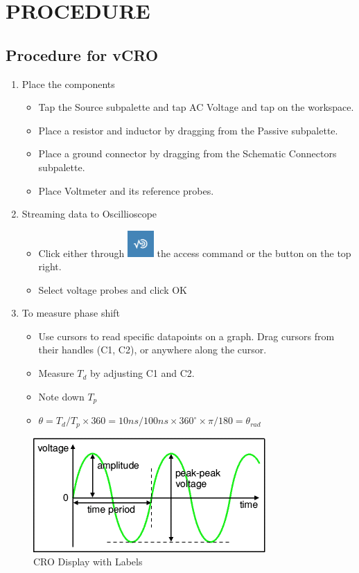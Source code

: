 \documentclass{article}
\begin{document}
\newline

\section{\LARGE PROCEDURE}
\subsection{Procedure for vCRO}
\begin{enumerate}
\item Place the components
\begin{itemize}
\item Tap the Source subpalette and tap AC Voltage and tap on the workspace.
\item Place a resistor and inductor by dragging from the Passive subpalette.
\item Place a ground connector by dragging from the Schematic Connectors subpalette.
\item Place Voltmeter and its reference probes.
\end{itemize}
\newpage
\item Streaming data to Oscillioscope
\begin{itemize}
\item Click either through \includegraphics[width = 1cm, height = 1cm]{stream.png} the access command or the button on the top right.
\item Select voltage probes and click OK
\end{itemize}
\item To measure phase shift
\begin{itemize}
\item Use cursors to read specific datapoints on a graph. Drag cursors from their handles (C1, C2), or anywhere along the cursor. 
\item Measure $T_d$ by adjusting C1 and C2.
\item Note down $T_p$
\item $
\theta=T_{d} / T_{p} \times 360=10 n s / 100 n s \times 360^{\circ} \times \pi/180 =\theta_{rad}
$

\end{itemize}
\end{enumerate}
\begin{figure}[h]
    \centering
    \includegraphics[width = 10cm \textwidth]{lissajous.png}
    \caption{CRO Display with Labels \cite{CRO_Display}}
\end{figure}
\newpage
\end{document}
